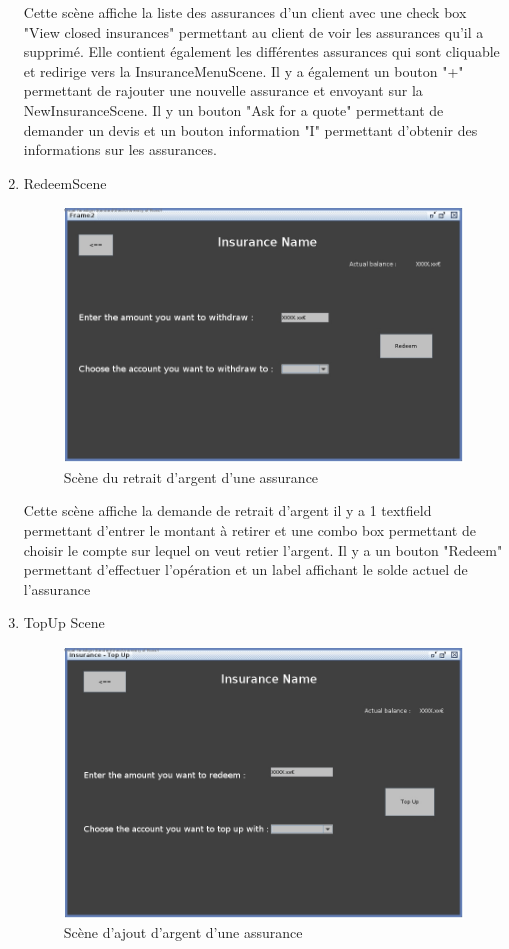 \documentclass[../rapport.tex]{subfiles}
\begin{document}
\begin{enumerate}
						Cette scène affiche la liste des assurances d'un client avec une check box "View closed insurances" permettant au client de voir 
						les assurances qu'il a supprimé. Elle contient également les différentes assurances qui sont cliquable et redirige vers la 
						InsuranceMenuScene. 
						Il y a également un bouton "+" permettant de rajouter une nouvelle assurance et envoyant sur la NewInsuranceScene.
						Il y un bouton "Ask for a quote" permettant de demander un devis et un bouton information "I" permettant d'obtenir des informations
						sur les assurances.
						\newpage
				\item{RedeemScene} 
						\begin{figure}[h!]
								\centering\includegraphics[scale=0.3]{ressources/photos_diagrammes/extensionThomas/gui1/redeemInsurance.jpg}
								\caption{Scène du retrait d'argent d'une assurance}
						\end{figure}
						Cette scène affiche la demande de retrait d'argent il y a 1 textfield permettant d'entrer le montant à retirer et une combo box 
						permettant de choisir le compte sur lequel on veut retier l'argent. Il y a un bouton "Redeem" permettant d'effectuer l'opération
						et un label affichant le solde actuel de l'assurance
						\newpage
				\item{TopUp Scene} 
						\begin{figure}[h!]
								\centering\includegraphics[scale=0.3]{ressources/photos_diagrammes/extensionThomas/gui1/topUpInsurance.jpg}
								\caption{Scène d'ajout d'argent d'une assurance}


\end{figure}
\end{enumerate}
\end{document}
